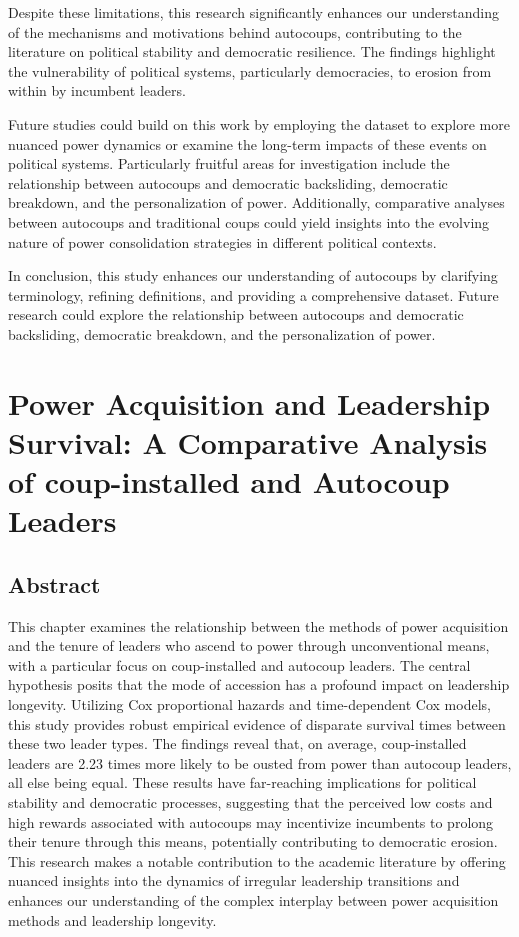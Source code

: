 \documentclass[
  12pt,
]{report}
\begin{document}
Despite these limitations, this research significantly enhances our
understanding of the mechanisms and motivations behind autocoups,
contributing to the literature on political stability and democratic
resilience. The findings highlight the vulnerability of political
systems, particularly democracies, to erosion from within by incumbent
leaders.

Future studies could build on this work by employing the dataset to
explore more nuanced power dynamics or examine the long-term impacts of
these events on political systems. Particularly fruitful areas for
investigation include the relationship between autocoups and democratic
backsliding, democratic breakdown, and the personalization of power.
Additionally, comparative analyses between autocoups and traditional
coups could yield insights into the evolving nature of power
consolidation strategies in different political contexts.

In conclusion, this study enhances our understanding of autocoups by
clarifying terminology, refining definitions, and providing a
comprehensive dataset. Future research could explore the relationship
between autocoups and democratic backsliding, democratic breakdown, and
the personalization of power.

\chapter{Power Acquisition and Leadership Survival: A Comparative
Analysis of coup-installed and Autocoup
Leaders}\label{power-acquisition-and-leadership-survival-a-comparative-analysis-of-coup-installed-and-autocoup-leaders}

\section*{Abstract}\label{abstract-3}

This chapter examines the relationship between the methods of power
acquisition and the tenure of leaders who ascend to power through
unconventional means, with a particular focus on coup-installed and
autocoup leaders. The central hypothesis posits that the mode of
accession has a profound impact on leadership longevity. Utilizing Cox
proportional hazards and time-dependent Cox models, this study provides
robust empirical evidence of disparate survival times between these two
leader types. The findings reveal that, on average, coup-installed
leaders are 2.23 times more likely to be ousted from power than autocoup
leaders, all else being equal. These results have far-reaching
implications for political stability and democratic processes,
suggesting that the perceived low costs and high rewards associated with
autocoups may incentivize incumbents to prolong their tenure through
this means, potentially contributing to democratic erosion. This
research makes a notable contribution to the academic literature by
offering nuanced insights into the dynamics of irregular leadership
transitions and enhances our understanding of the complex interplay
between power acquisition methods and leadership longevity.
\end{document}
